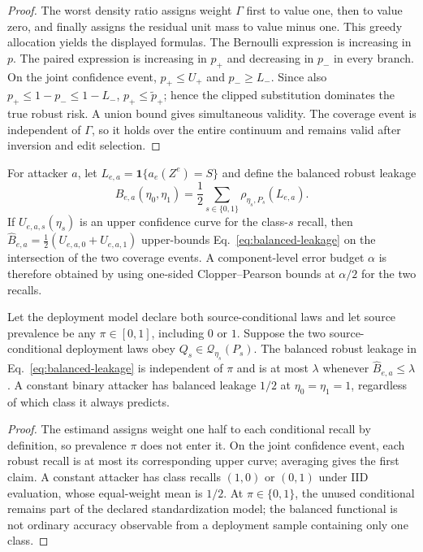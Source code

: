 \begin{proof}
The worst density ratio assigns weight $\Gamma$ first to value one, then to
value zero, and finally assigns the residual unit mass to value minus one.
This greedy allocation yields the displayed formulas. The Bernoulli expression
is increasing in $p$. The paired expression is increasing in $p_+$ and
decreasing in $p_-$ in every branch. On the joint confidence event,
$p_+\leq U_+$ and $p_-\geq L_-$. Since also $p_+\leq1-p_-\leq1-L_-$,
$p_+\leq\widetilde p_+$; hence the clipped substitution dominates the true
robust risk. A union bound gives simultaneous validity. The coverage event is
independent of $\Gamma$, so it holds over the entire continuum and remains
valid after inversion and edit selection.
\end{proof}

For attacker $a$, let $L_{e,a}=\mathbf 1\{a_e(Z^e)=S\}$ and define the
balanced robust leakage
\begin{equation}
 B_{e,a}(\eta_0,\eta_1)
 =\frac12\sum_{s\in\{0,1\}}\rho_{\eta_s,P_s}(L_{e,a}).
 \label{eq:balanced-leakage}
\end{equation}
If $U_{e,a,s}(\eta_s)$ is an upper confidence curve for the class-$s$
recall, then
$\widehat B_{e,a}=\tfrac12(U_{e,a,0}+U_{e,a,1})$ upper-bounds
Eq.~\eqref{eq:balanced-leakage} on the intersection of the two coverage
events. A component-level error budget $\alpha$ is therefore obtained by
using one-sided Clopper--Pearson bounds at $\alpha/2$ for the two recalls.

\begin{lemma}
\label{prop:source-prior}
Let the deployment model declare both source-conditional laws and let source
prevalence be any $\pi\in[0,1]$, including $0$ or $1$. Suppose the two
source-conditional deployment laws obey
$Q_s\in\mathcal Q_{\eta_s}(P_s)$. The balanced robust leakage in
Eq.~\eqref{eq:balanced-leakage} is independent of $\pi$ and is at most
$\lambda$ whenever $\widehat B_{e,a}\leq\lambda$. A constant binary attacker
has balanced leakage $1/2$ at $\eta_0=\eta_1=1$, regardless of which class it
always predicts.
\end{lemma}

\begin{proof}
The estimand assigns weight one half to each conditional recall by definition,
so prevalence $\pi$ does not enter it. On the joint confidence event, each
robust recall is at most its corresponding upper curve; averaging gives the
first claim. A constant attacker has class recalls $(1,0)$ or $(0,1)$ under
IID evaluation, whose equal-weight mean is $1/2$.
At $\pi\in\{0,1\}$, the unused conditional remains part of the declared
standardization model; the balanced functional is not ordinary accuracy
observable from a deployment sample containing only one class.
\end{proof}

